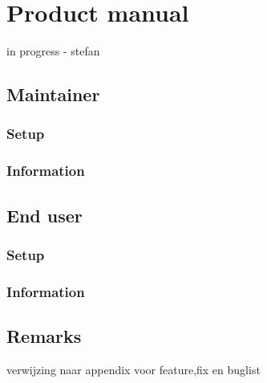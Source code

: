 \chapter{Product manual}

\begin{tcolorbox}[colback=green!30]
  in progress - stefan
\end{tcolorbox}

\section{Maintainer}
\subsection{Setup}
\subsection{Information}


\section{End user}
\subsection{Setup}
\subsection{Information}

\section{Remarks}

\begin{tcolorbox}[colback=yellow!30]
 verwijzing naar appendix voor feature,fix en buglist
\end{tcolorbox}




